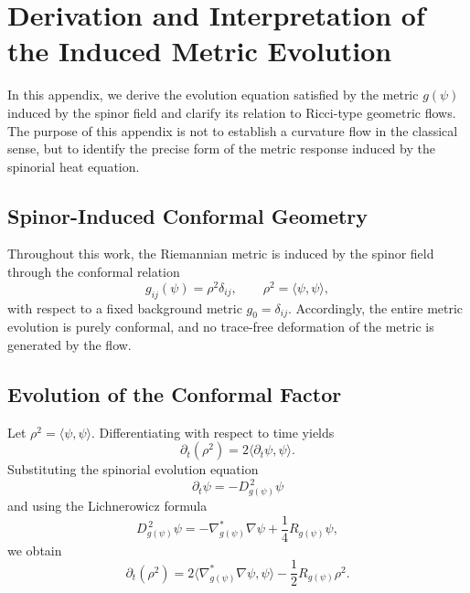 \documentclass[11pt, reqno, a4paper]{amsart}
\theoremstyle{definition}
\theoremstyle{remark}
\begin{document}
\appendix
\section{Derivation and Interpretation of the Induced Metric Evolution}
\label{app:metric_evolution}

In this appendix, we derive the evolution equation satisfied by the metric
$g(\psi)$ induced by the spinor field and clarify its relation to Ricci-type
geometric flows. The purpose of this appendix is not to establish a curvature flow in the
classical sense, but to identify the precise form of the metric response induced
by the spinorial heat equation.

\subsection{Spinor-Induced Conformal Geometry}

Throughout this work, the Riemannian metric is induced by the spinor field
through the conformal relation
\begin{equation}
g_{ij}(\psi) = \rho^2 \delta_{ij}, \qquad
\rho^2 = \langle \psi , \psi \rangle ,
\label{eq:conformal_metric}
\end{equation}
with respect to a fixed background metric $g_0 = \delta_{ij}$.
Accordingly, the entire metric evolution is purely conformal, and no
trace-free deformation of the metric is generated by the flow.

\subsection{Evolution of the Conformal Factor}

Let $\rho^2 = \langle \psi , \psi \rangle$.
Differentiating with respect to time yields
\begin{equation}
\partial_t (\rho^2)
= 2 \langle \partial_t \psi , \psi \rangle .
\label{eq:rho_time_derivative}
\end{equation}
Substituting the spinorial evolution equation
\[
\partial_t \psi = - D_{g(\psi)}^{\,2} \psi
\]
and using the Lichnerowicz formula
\begin{equation}
D_{g(\psi)}^{\,2} \psi
= - \nabla^{*}_{g(\psi)} \nabla \psi
+ \frac{1}{4} R_{g(\psi)} \psi ,
\label{eq:lichnerowicz_appendix}
\end{equation}
we obtain
\begin{equation}
\partial_t (\rho^2)
= 2 \langle \nabla^{*}_{g(\psi)} \nabla \psi , \psi \rangle
- \frac{1}{2} R_{g(\psi)} \rho^2 .
\label{eq:rho_intermediate}
\end{equation}
\end{document}
